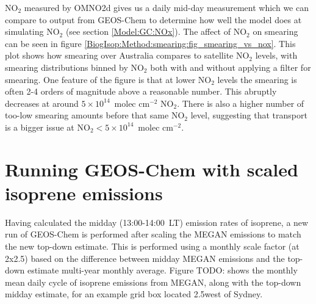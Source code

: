       NO$_2$ measured by OMNO2d gives us a daily mid-day measurement which we can compare to output from GEOS-Chem to determine how well the model does at simulating NO$_2$ (see section \ref{Model:GC:NOx}).
      The affect of NO$_2$ on smearing can be seen in figure \ref{BiogIsop:Method:smearing:fig_smearing_vs_nox}.
      This plot shows how smearing over Australia compares to satellite NO$_2$ levels, with smearing distributions binned by NO$_2$ both with and without applying a filter for smearing.
      One feature of the figure is that at lower NO$_2$ levels the smearing is often 2-4 orders of magnitude above a reasonable number. 
      This abruptly decreases at around $5 \times 10^{14} $~molec cm$^{-2}$ NO$_2$.
      There is also a higher number of too-low smearing amounts before that same NO$_2$ level, suggesting that transport is a bigger issue at NO$_2 < 5 \times 10^{14} $~molec cm$^{-2}$. 
      

\section{Running GEOS-Chem with scaled isoprene emissions}
\label{BioIsop:ScaledRun}
  
  Having calculated the midday (13:00-14:00~LT) emission rates of isoprene, a new run of GEOS-Chem is performed after scaling the MEGAN emissions to match the new top-down estimate.
  This is performed using a monthly scale factor (at 2x2.5\degr) based on the difference between midday MEGAN emissions and the top-down estimate multi-year monthly average.
  Figure TODO: shows the monthly mean daily cycle of isoprene emissions from MEGAN, along with the top-down midday estimate, for an example grid box located 2.5\degr west of Sydney.
  
